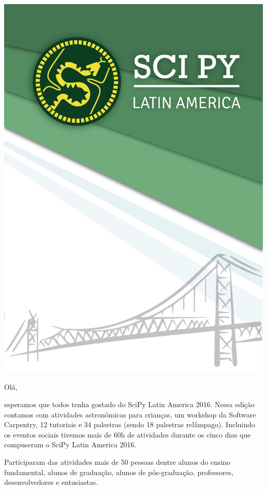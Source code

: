 \documentclass[12pt]{article}
\begin{document}
\thispagestyle{empty}
\noindent  %
\includegraphics{../../assets/capa}
\NoBgThispage

\clearpage

\restoregeometry

\newpage

Olá,

esperamos que todos tenha gostado do SciPy Latin America 2016.
Nessa edição contamos com atividades astronômicas para crianças,
um workshop da Software Carpentry,
12 tutoriais e 34 palestras (sendo 18 palestras relâmpago).
Incluindo os eventos sociais tivemos mais de 60h de atividades durante os cinco
dias que compuseram o SciPy Latin America 2016.

Participaram das atividades mais de 50 pessoas dentre
alunos do ensino fundamental,
alunos de graduação,
alunos de pós-graduação,
professores,
desenvolvedores
e entusiastas.
\end{document}
